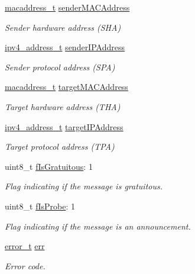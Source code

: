\begin{DoxyCompactItemize}
\mbox{\hyperlink{group__ethernet_gacb865bcbf50a6c8cef05581bfabff373}{macaddress\+\_\+t}} \mbox{\hyperlink{struct_a_r_p__message__t_a493c6c0fac00d24d97c5dd27e448d192}{sender\+M\+A\+C\+Address}}
\begin{DoxyCompactList}\small\item\em Sender hardware address (S\+HA) \end{DoxyCompactList}\item 
\mbox{\hyperlink{group__ipv4_gad9df0882950e70d0587a4b423beb261a}{ipv4\+\_\+address\+\_\+t}} \mbox{\hyperlink{struct_a_r_p__message__t_a9532eb4e3dafc35df5f0cbd0598e6064}{sender\+I\+P\+Address}}
\begin{DoxyCompactList}\small\item\em Sender protocol address (S\+PA) \end{DoxyCompactList}\item 
\mbox{\hyperlink{group__ethernet_gacb865bcbf50a6c8cef05581bfabff373}{macaddress\+\_\+t}} \mbox{\hyperlink{struct_a_r_p__message__t_a07b2e71c5ec73e1d4828fd350bd4f041}{target\+M\+A\+C\+Address}}
\begin{DoxyCompactList}\small\item\em Target hardware address (T\+HA) \end{DoxyCompactList}\item 
\mbox{\hyperlink{group__ipv4_gad9df0882950e70d0587a4b423beb261a}{ipv4\+\_\+address\+\_\+t}} \mbox{\hyperlink{struct_a_r_p__message__t_a311d8e70c5a5a8b8b1e613e44ba25639}{target\+I\+P\+Address}}
\begin{DoxyCompactList}\small\item\em Target protocol address (T\+PA) \end{DoxyCompactList}\item 
uint8\+\_\+t \mbox{\hyperlink{struct_a_r_p__message__t_a10f6f518105e71039413d95c27db5a5d}{f\+Is\+Gratuitous}}\+: 1
\begin{DoxyCompactList}\small\item\em Flag indicating if the message is gratuitous. \end{DoxyCompactList}\item 
uint8\+\_\+t \mbox{\hyperlink{struct_a_r_p__message__t_ad84934498bc8cb014f7ccfd3df0eaaab}{f\+Is\+Probe}}\+: 1
\begin{DoxyCompactList}\small\item\em Flag indicating if the message is an announcement. \end{DoxyCompactList}\item 
\mbox{\hyperlink{structerror__t}{error\+\_\+t}} \mbox{\hyperlink{struct_a_r_p__message__t_a79e8f977787d9fccf257bbbccaaf3522}{err}}
\begin{DoxyCompactList}\small\item\em Error code. \end{DoxyCompactList}\end{DoxyCompactItemize}


